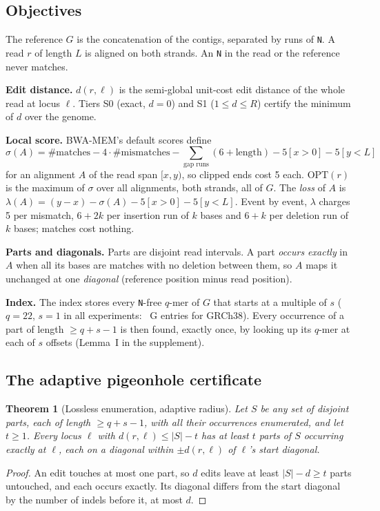 \documentclass[11pt]{article}
\newtheorem{theorem}{Theorem}
\theoremstyle{definition}
\newcommand{\OPT}{\mathrm{OPT}}
\begin{document}
\subsection{Objectives}

The reference $G$ is the concatenation of the contigs, separated by runs
of \texttt{N}. A read $r$ of length $L$ is aligned on both strands. An
\texttt{N} in the read or the reference never matches.

\textbf{Edit distance.} $d(r,\ell)$ is the semi-global unit-cost edit
distance of the whole read at locus $\ell$. Tiers S0 (exact, $d=0$) and S1
($1\le d\le R$) certify the minimum of $d$ over the genome.

\textbf{Local score.} BWA-MEM's default scores define
\[
\sigma(A) = \#\text{matches} - 4\cdot\#\text{mismatches}
 - \sum_{\text{gap runs}} (6 + \text{length}) - 5[x>0] - 5[y<L]
\]
for an alignment $A$ of the read span $[x,y)$, so clipped ends cost 5
each. $\OPT(r)$ is the maximum of $\sigma$ over all alignments, both
strands, all of $G$. The \emph{loss} of $A$ is
$\lambda(A) = (y-x) - \sigma(A) - 5[x>0] - 5[y<L]$. Event by event,
$\lambda$ charges 5 per mismatch, $6+2k$ per insertion run of $k$ bases
and $6+k$ per deletion run of $k$ bases; matches cost nothing.

\textbf{Parts and diagonals.} Parts are disjoint read intervals. A part
\emph{occurs exactly} in $A$ when all its bases are matches with no
deletion between them, so $A$ maps it unchanged at one \emph{diagonal}
(reference position minus read position).

\textbf{Index.} The index stores every \texttt{N}-free $q$-mer of $G$ that
starts at a multiple of $s$ ($q=22$, $s=1$ in all experiments: \IdxEntries~G
entries for GRCh38). Every occurrence of a part of length $\ge q+s-1$ is
then found, exactly once, by looking up its $q$-mer at each of $s$ offsets
(Lemma~I in the supplement).

\subsection{The adaptive pigeonhole certificate}\label{sec:pigeon}

\begin{theorem}[Lossless enumeration, adaptive radius]\label{thm:pigeon}
Let $S$ be any set of disjoint parts, each of length $\ge q+s-1$, with all
their occurrences enumerated, and let $t\ge1$. Every locus $\ell$ with
$d(r,\ell)\le |S|-t$ has at least $t$ parts of $S$ occurring exactly at
$\ell$, each on a diagonal within $\pm d(r,\ell)$ of $\ell$'s start
diagonal.
\end{theorem}
\begin{proof}
An edit touches at most one part, so $d$ edits leave at least
$|S|-d\ge t$ parts untouched, and each occurs exactly. Its diagonal differs
from the start diagonal by the number of indels before it, at most $d$.
\end{proof}
\end{document}
